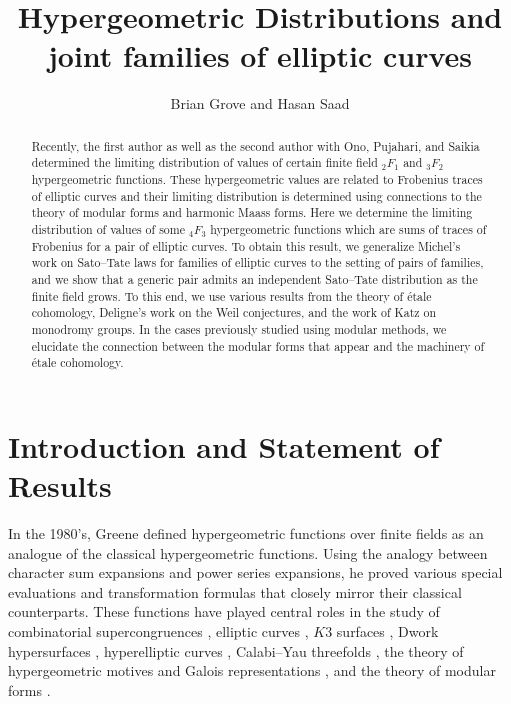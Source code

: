 \documentclass[12pt]{amsart}
\theoremstyle{definition}
\theoremstyle{remark}
\numberwithin{equation}{section}
\begin{document}
\title{Hypergeometric Distributions and joint families of elliptic curves}


\address{Department of Mathematics, Texas State University, San Marcos, TX 78666}

\address{Department of Mathematics, Louisiana State University, Baton Rouge, LA 70803}

\author{Brian Grove and Hasan Saad}


\begin{abstract}
Recently, the first author as well as the second author with Ono, Pujahari, and Saikia determined the limiting distribution of values of certain finite field ${_2F_1}$ and ${_3F_2}$ hypergeometric functions. These hypergeometric values are related to Frobenius traces of elliptic curves and their limiting distribution is determined using connections to the theory of modular forms and harmonic Maass forms. Here we determine the limiting distribution of values of some ${_4F_3}$ hypergeometric functions which are sums of traces of Frobenius for a pair of elliptic curves. To obtain this result, we generalize Michel's work on Sato--Tate laws for families of elliptic curves to the setting of pairs of families, and we show that a generic pair admits an independent Sato--Tate distribution as the finite field grows. To this end, we use various results from the theory of \'etale cohomology, Deligne's work on the Weil conjectures, and the work of Katz on monodromy groups. In the cases previously studied using modular methods, we elucidate the connection between the modular forms that appear and the machinery of \'etale cohomology.
\end{abstract}

\maketitle


\section{Introduction and Statement of Results}

In the 1980's, Greene \cite{GreenePhD, GreenePaper} defined hypergeometric functions over finite fields as an analogue of the classical hypergeometric functions. Using the analogy between character sum expansions and power series expansions, he proved various special evaluations and transformation formulas that closely mirror their classical counterparts. These functions have played central roles in the study of combinatorial supercongruences \cite{CS1,CS2,CS3,CS4,CS5,CS6}, elliptic curves \cite{EC1,EC2,EC3,EC4,EC5,EC6}, $K3$ surfaces \cite{K31,K32,EC5}, Dwork hypersurfaces \cite{Dwork1,Dwork2,Dwork3}, hyperelliptic curves \cite{hyper1,hyper2}, Calabi--Yau threefolds \cite{CY1,CY2}, the theory of hypergeometric motives and Galois representations \cite{HM1,HM2,HMM1,HMM2,FusEtAl}, and the theory of modular forms \cite{MM1,MM2,MM3,MM4,MM5,MM6, HLLT}.
\end{document}

